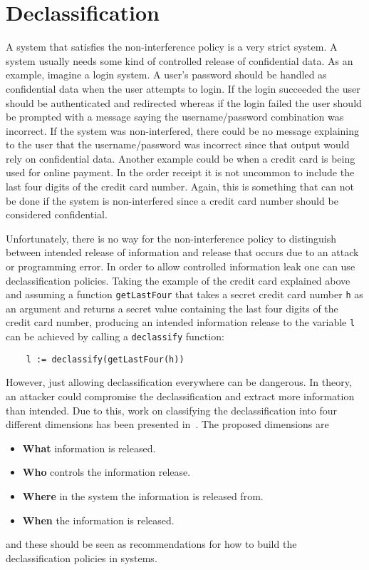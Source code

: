 \section{Declassification}
\label{chapter:declassification}
A system that satisfies the non-interference policy is a very strict system. A system usually needs some kind of controlled release of confidential data. As an example, imagine a login system. A user's password should be handled as confidential data when the user attempts to login. If the login succeeded the user should be authenticated and redirected whereas if the login failed the user should be prompted with a message saying the username/password combination was incorrect. If the system was non-interfered, there could be no message explaining to the user that the username/password was incorrect since that output would rely on confidential data. Another example could be when a credit card is being used for online payment. In the order receipt it is not uncommon to include the last four digits of the credit card number. Again, this is something that can not be done if the system is non-interfered since a credit card number should be considered confidential.

Unfortunately, there is no way for the non-interference policy to distinguish between intended release of information and release that occurs due to an attack or programming error. In order to allow controlled information leak one can use declassification policies.
Taking the example of the credit card explained above and assuming a function {\tt getLastFour} that takes a secret credit card number {\tt h} as an argument and returns a secret value containing the last four digits of the credit card number, producing an intended information release to the variable {\tt l} can be achieved by calling a {\tt declassify} function:
\begin{verbatim}
    l := declassify(getLastFour(h))
\end{verbatim}
However, just allowing declassification everywhere can be dangerous. In theory, an attacker could compromise the declassification and extract more information than intended. Due to this, work on classifying the declassification into four different dimensions has been presented in~\cite{declassification-dimensions}. The proposed dimensions are
\begin{itemize}
  \item \textbf{What} information is released.
  \item \textbf{Who} controls the information release.
  \item \textbf{Where} in the system the information is released from.
  \item \textbf{When} the information is released.
\end{itemize}
and these should be seen as recommendations for how to build the declassification policies in systems.
